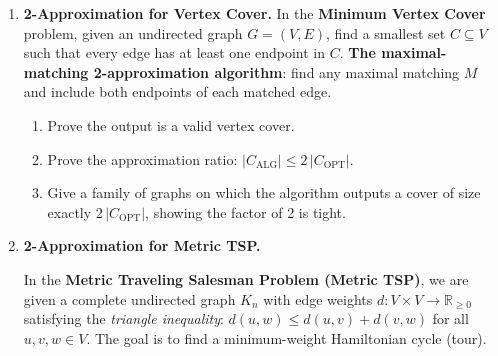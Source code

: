 \documentclass[9pt]{book}
\begin{document}
\begin{enumerate}[label=\arabic*.]

\bigskip


\item \textbf{2-Approximation for Vertex Cover.}
In the \textbf{Minimum Vertex Cover} problem, given an undirected graph $G=(V,E)$, find a
smallest set $C\subseteq V$ such that every edge has at least one endpoint in $C$.
{\bf The maximal-matching 2-approximation algorithm}: find any maximal matching $M$
        and include both endpoints of each matched edge.
\begin{enumerate}[label=(\alph*)]
  \item Prove the output is a valid vertex cover.
  \item Prove the approximation ratio: $|C_{\mathrm{ALG}}|\le 2\,|C_{\mathrm{OPT}}|$.
  \item Give a family of graphs on which the algorithm outputs a cover of size exactly
        $2\,|C_{\mathrm{OPT}}|$, showing the factor of 2 is tight.
\end{enumerate}

\bigskip

\item \textbf{2-Approximation for Metric TSP.}

In the \textbf{Metric Traveling Salesman Problem (Metric TSP)}, we are given a complete
undirected graph $K_n$ with edge weights $d:V\times V\to\mathbb{R}_{\ge 0}$ satisfying the
\emph{triangle inequality}: $d(u,w)\le d(u,v)+d(v,w)$ for all $u,v,w\in V$.
The goal is to find a minimum-weight Hamiltonian cycle (tour).


\end{enumerate}
\end{document}

